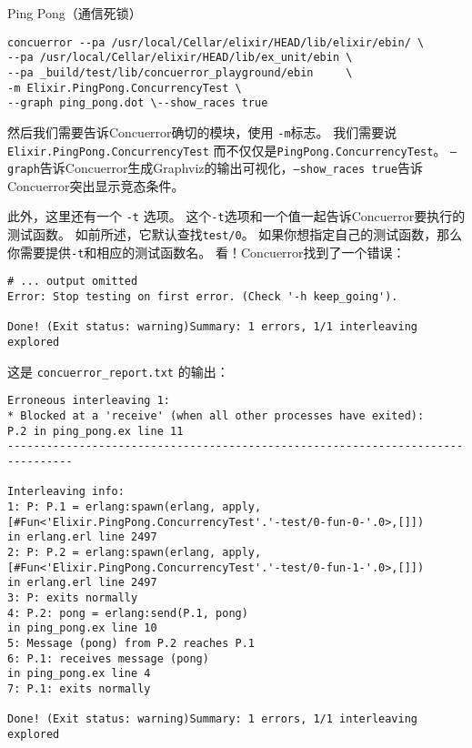 \begin{example}{Ping Pong（通信死锁）}
\begin{code}{}
\begin{verbatim}
concuerror --pa /usr/local/Cellar/elixir/HEAD/lib/elixir/ebin/ \
--pa /usr/local/Cellar/elixir/HEAD/lib/ex_unit/ebin \
--pa _build/test/lib/concuerror_playground/ebin     \
-m Elixir.PingPong.ConcurrencyTest \
--graph ping_pong.dot \--show_races true
\end{verbatim}
\end{code}

然后我们需要告诉Concuerror确切的模块，使用 \texttt{-m}标志。
我们需要说\texttt{Elixir.PingPong.ConcurrencyTest} 而不仅仅是\texttt{PingPong.ConcurrencyTest}。
\texttt{--graph}告诉Concuerror生成Graphviz的输出可视化，\texttt{--show\_races true}告诉Concuerror突出显示竞态条件。

此外，这里还有一个 \texttt{-t} 选项。
这个\texttt{-t}选项和一个值一起告诉Concuerror要执行的测试函数。
如前所述，它默认查找\texttt{test/0}。
如果你想指定自己的测试函数，那么你需要提供\texttt{-t}和相应的测试函数名。
看！Concuerror找到了一个错误：

\begin{code}{}
\begin{verbatim}
# ... output omitted
Error: Stop testing on first error. (Check '-h keep_going').

Done! (Exit status: warning)Summary: 1 errors, 1/1 interleaving explored
\end{verbatim}
\end{code}

这是 \texttt{concuerror\_report.txt} 的输出：

\begin{code}{}
\begin{verbatim}
Erroneous interleaving 1:
* Blocked at a 'receive' (when all other processes have exited):
P.2 in ping_pong.ex line 11
--------------------------------------------------------------------------------

Interleaving info:
1: P: P.1 = erlang:spawn(erlang, apply, [#Fun<'Elixir.PingPong.ConcurrencyTest'.'-test/0-fun-0-'.0>,[]])
in erlang.erl line 2497
2: P: P.2 = erlang:spawn(erlang, apply, [#Fun<'Elixir.PingPong.ConcurrencyTest'.'-test/0-fun-1-'.0>,[]])
in erlang.erl line 2497
3: P: exits normally
4: P.2: pong = erlang:send(P.1, pong)
in ping_pong.ex line 10
5: Message (pong) from P.2 reaches P.1
6: P.1: receives message (pong)
in ping_pong.ex line 4
7: P.1: exits normally

Done! (Exit status: warning)Summary: 1 errors, 1/1 interleaving explored
\end{verbatim}
\end{code}


\end{example}
